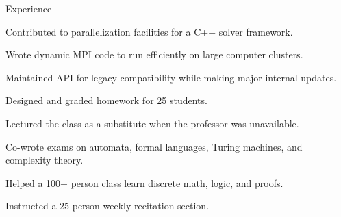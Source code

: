 \documentclass{cv}
\begin{document}

\begin{cvsection}{Experience}
  {
    \item Contributed to parallelization facilities for a C++ solver framework.
    \item Wrote dynamic MPI code to run efficiently on large computer clusters.
    \item Maintained API for legacy compatibility while making major internal updates.
  }
  {
    \item Designed and graded homework for 25 students.
    \item Lectured the class as a substitute when the professor was unavailable.
    \item Co-wrote exams on automata, formal languages, Turing machines, and complexity theory.
  }
  {
    \item Helped a 100+ person class learn discrete math, logic, and proofs.
    \item Instructed a 25-person weekly recitation section.
  }
\end{cvsection}
\end{document}
